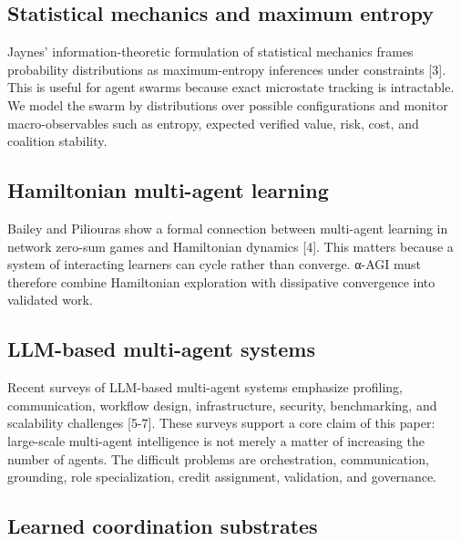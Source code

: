 \documentclass[11pt]{article}
\begin{document}
\subsection{Statistical mechanics and maximum entropy}\label{statistical-mechanics-and-maximum-entropy}

Jaynes' information-theoretic formulation of statistical mechanics frames probability distributions as maximum-entropy inferences under constraints {[}3{]}. This is useful for agent swarms because exact microstate tracking is intractable. We model the swarm by distributions over possible configurations and monitor macro-observables such as entropy, expected verified value, risk, cost, and coalition stability.

\subsection{Hamiltonian multi-agent learning}\label{hamiltonian-multi-agent-learning}

Bailey and Piliouras show a formal connection between multi-agent learning in network zero-sum games and Hamiltonian dynamics {[}4{]}. This matters because a system of interacting learners can cycle rather than converge. α-AGI must therefore combine Hamiltonian exploration with dissipative convergence into validated work.

\subsection{LLM-based multi-agent systems}\label{llm-based-multi-agent-systems}

Recent surveys of LLM-based multi-agent systems emphasize profiling, communication, workflow design, infrastructure, security, benchmarking, and scalability challenges {[}5-7{]}. These surveys support a core claim of this paper: large-scale multi-agent intelligence is not merely a matter of increasing the number of agents. The difficult problems are orchestration, communication, grounding, role specialization, credit assignment, validation, and governance.

\subsection{Learned coordination substrates}\label{learned-coordination-substrates}
\end{document}
